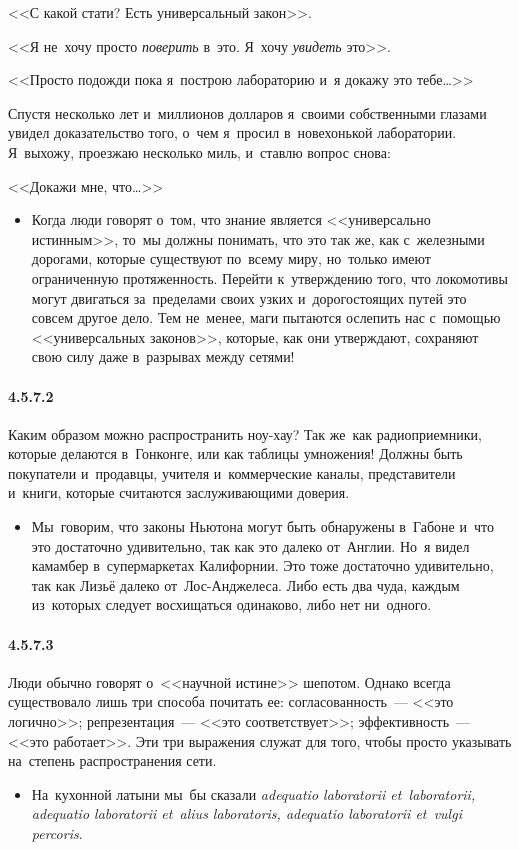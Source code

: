<<С какой стати? Есть универсальный закон>>.

<<Я не~хочу просто {\itshape поверить} в~это. Я~хочу {\itshape увидеть} это>>.

<<Просто подожди пока я~построю лабораторию и~я докажу это тебе\ldots>>

Спустя несколько лет и~миллионов долларов я~своими собственными глазами увидел доказательство того, о~чем я~просил в~новехонькой лаборатории. Я~выхожу, проезжаю несколько миль, и~ставлю вопрос снова:

<<Докажи мне, что\ldots>> 

	\begin{itemize}
	\item 
	Когда люди говорят о~том, что знание является <<универсально истинным>>, то~мы должны понимать, что это так же, как с~железными дорогами, которые существуют по~всему миру, но~только имеют ограниченную протяженность. Перейти к~утверждению того, что локомотивы могут двигаться за~пределами своих узких и~дорогостоящих путей это совсем другое дело. Тем не~менее, маги пытаются ослепить нас с~помощью <<универсальных законов>>, которые, как они утверждают, сохраняют свою силу даже в~разрывах между сетями!
	\end{itemize}

\paragraph{4.5.7.2}\hypertarget{par:4.5.7.2}{} Каким образом можно распространить ноу-хау? Так же~как радиоприемники, которые делаются в~Гонконге, или как таблицы умножения! Должны быть покупатели и~продавцы, учителя и~коммерческие каналы, представители и~книги, которые считаются заслуживающими доверия. 
	\begin{itemize}
	\item 
 Мы~говорим, что законы Ньютона могут быть обнаружены в~Габоне и~что это достаточно удивительно, так как это далеко от~Англии. Но~я видел камамбер в~супермаркетах Калифорнии. Это тоже достаточно удивительно, так как Лизьё далеко от~Лос-Анджелеса. Либо есть два чуда, каждым из~которых следует восхищаться одинаково, либо нет ни~одного.
	\end{itemize}	

\paragraph{4.5.7.3}\hypertarget{par:4.5.7.3}{} Люди обычно говорят о~<<научной истине>> шепотом. Однако всегда существовало лишь три способа почитать ее: согласованность~--- <<это логично>>; репрезентация~--- <<это соответствует>>; эффективность~--- <<это работает>>. Эти три выражения служат для того, чтобы просто указывать на~степень распространения сети. 
	\begin{itemize}
	\item 
 На~кухонной латыни мы~бы сказали {\itshape adequatio laboratorii et~laboratorii, adequatio laboratorii et~alius laboratoris, adequatio laboratorii et~vulgi percoris}.
	\end{itemize}


